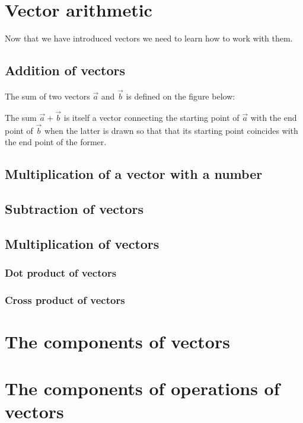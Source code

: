 \section{Vector arithmetic}

\noindent Now that we have introduced vectors we need to learn how to work with them. 

\subsection{Addition of vectors}

\noindent The sum of two vectors $\vec{a}$ and $\vec{b}$ is defined on the figure below:

\noindent The sum $\vec{a}+\vec{b}$ is itself a vector connecting the starting point of $\vec{a}$ with the end point of $\vec{b}$ when the latter is drawn so that that its starting point coincides with the end point of the former.

\subsection{Multiplication of a vector with a number}

\subsection{Subtraction of vectors}

\subsection{Multiplication of vectors}

\subsubsection{Dot product of vectors}

\subsubsection{Cross product of vectors}

\section{The components of vectors}

\section{The components of operations of vectors}

